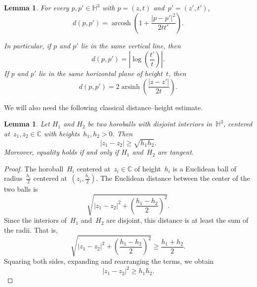 \documentclass[11pt,reqno]{amsart}
\newtheorem{lemma}[theorem]{Lemma}
\theoremstyle{definition}
\numberwithin{equation}{section}
\newcommand\C {{\mathbb C}}
\newcommand{\HH}{{\mathbb H}}
\DeclareMathOperator{\arsinh}{arsinh}
\DeclareMathOperator{\arcosh}{arcosh}
\numberwithin{equation}{section}
\begin{document}
\begin{lemma}
For every $p,p' \in \HH^3$ with $p=(z,t)$ and~$p'=(z',t')$,
\begin{equation} \label{eq:hyp-eucl} 
d(p,p') = \arcosh \left( 1+ \frac{|p-p'|^2}{2 tt'} \right).
\end{equation}

In particular, if $p$ and $p'$ lie in the same vertical line, then
\begin{equation} \label{eq:hyp-eucl2} 
d(p,p') = \left| \log \left( \frac{t'}{t} \right) \right|.
\end{equation}
If $p$ and $p'$ lie in the same horizontal plane of height~$t$, then
\begin{equation} \label{eq:hyp-eucl3} 
d(p,p') = 2 \arsinh \left( \frac{|z-z'|}{2t} \right).
\end{equation}
%
\end{lemma}

We will also need the following classical distance--height estimate.

\begin{lemma}
Let $H_1$ and $H_2$ be two horoballs with disjoint interiors in~$\HH^3$, centered at~$z_1, z_2 \in \C$ with heights~$h_1, h_2 >0$.
Then
\begin{equation} \label{eq:h1h2}
| z_1 - z_2 | \geq \sqrt{h_1 h_2}.
\end{equation}
Moreover, equality holds if and only if $H_1$ and~$H_2$ are tangent.
\end{lemma}

\begin{proof}
The horoball~$H_i$ centered at~$z_i \in \C$ of height~$h_i$ is a Euclidean ball of radius~$\frac{h_i}{2}$ centered at~$(z_i,\frac{h_i}{2})$.
The Euclidean distance between the center of the two balls is 
\[
\sqrt{|z_1-z_2|^2 + \left( \frac{h_1-h_2}{2} \right)^2}.
\]
Since the interiors of~$H_1$ and~$H_2$ are disjoint, this distance is at least the sum of the radii.
That is,
\[
\sqrt{|z_1-z_2|^2 + \left( \frac{h_1-h_2}{2} \right)^2} \geq \frac{h_1 + h_2}{2}.
\]
Squaring both sides, expanding and rearranging the terms, we obtain
\[
|z_1-z_2|^2 \geq h_1 h_2.
\]
\end{proof}
\end{document}
